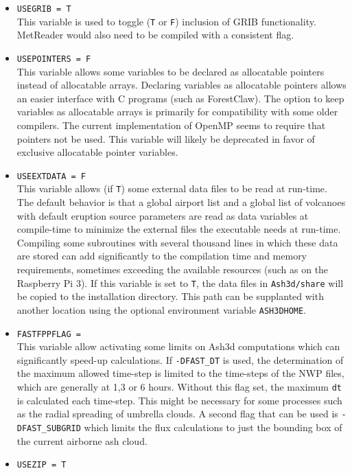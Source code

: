 \begin{itemize}
 \item \texttt{USEGRIB   = T}\\
This variable is used to toggle (\texttt{T} or \texttt{F}) inclusion of GRIB
functionality. MetReader would also need to be compiled with a consistent flag.
 \item \texttt{USEPOINTERS = F}\\
This variable allows some variables to be declared as allocatable pointers instead
of allocatable arrays. Declaring variables as allocatable pointers allows an easier
interface with C programs (such as ForestClaw). The option to keep variables as
allocatable arrays is primarily for compatibility with some older compilers. The
current implementation of OpenMP seems to require that pointers not be used.
This variable
will likely be deprecated in favor of exclusive allocatable pointer variables.
 \item \texttt{USEEXTDATA = F}\\
This variable allows (if \texttt{T}) some external data files to be read at run-time.
The default behavior is that a global airport list and a global list of volcanoes with
default eruption source parameters are read as data variables at compile-time
to minimize the external files the executable needs at run-time. Compiling
some subroutines with several thousand lines in which these data are stored can add
significantly to the compilation time and memory requirements, sometimes exceeding
the available resources (such as on the Raspberry Pi 3). If this variable is set to
\texttt{T}, the data files in \texttt{Ash3d/share} will be copied to the installation
directory. This path can be supplanted with another location using the optional
environment variable \texttt{ASH3DHOME}.
 \item \texttt{FASTFPPFLAG = }\\
This variable allow activating some limits on Ash3d computations which can significantly
speed-up calculations. If \texttt{-DFAST\_DT} is used, the determination of the
maximum allowed time-step is limited to the time-steps of the NWP files, which are
generally at 1,3 or 6 hours. Without this flag set, the maximum \texttt{dt} is
calculated each time-step. This might be necessary for some processes such as
the radial spreading of umbrella clouds. A second flag that can be used is
\texttt{-DFAST\_SUBGRID} which limits the flux calculations to just the bounding
box of the current airborne ash cloud.
 \item \texttt{USEZIP = T}\\

\end{itemize}
